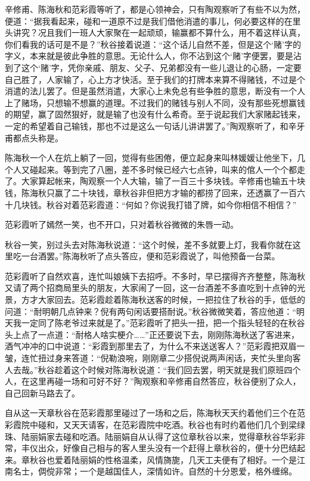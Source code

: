 \documentclass[12pt,UTF8]{ctexbook}
\begin{document}
{{{辛修甫、陈海秋和范彩霞等听了，都是心领神会，只有陶观察听了有些不以为然，便道：“据我看起来，碰和一道原不过是我们借他消遣的事儿，何必要这样的在里头讲究？况且我们一班人大家聚在一起顽顽，输赢都不算什么，用不着这样认真，你们看我的话可是不是？”秋谷接着说道：“这个话儿自然不差，但是这个‘赌’字的字义，本来就是彼此争胜的意思。无论什么人，你不沾到这个‘赌’字便罢，要是沾到了这个‘赌’字，凭你亲戚、朋友、父子、兄弟都没有一些儿退让的心肠，一定要自己胜了，人家输了，心上方才快活。至于我们的打牌本来算不得赌钱，不过是个消遣的法儿罢了。但是虽然消遣，大家心上未免总有些争胜的意思，断没有一个人上了赌场，只想输不想赢的道理。不过我们的赌钱与别人不同，没有那些死想赢钱的期望，赢了固然狠好，就是输了也没有什么希奇。至于说起我们大家赌起钱来，一定的希望着自己输钱，那也不过是这么一句话儿讲讲罢了。”陶观察听了，和辛牙甫都点头称是。

陈海秋一个人在炕上躺了一回，觉得有些困倦，便立起身来叫林媛媛让他坐下，几个人又碰起来。等到完了八圈，差不多时候已经六七点钟，叫来的倌人一个个都走了。大家算起帐来，陶观察一个人大输，输了一百三十多块钱。辛修甫也输五十块钱，陈海秋只赢了二十块钱，章秋谷非但把方才输的都捞了回来，还透赢了一百六十几块钱。秋谷对着范彩霞道：“何如？你说我打错了牌，如今你相信不相信？”

范彩霞听了嫣然一笑，也不开口，只对着秋谷微微的朱唇一动。

秋谷一笑，别过头去对陈海秋说道：“这个时候，差不多就要上灯，我看你就在这里吃一台酒罢。”陈海秋听了点头答应，便和范彩霞说了，叫他预备一台菜。

范彩霞听了自然欢喜，连忙叫娘姨下去招呼。不多时，早已摆得齐齐整整，陈海秋又请了两个招商局里头的朋友，大家闹了一回，这一台酒差不多直吃到十点钟的光景，方才大家回去。范彩霞趁着陈海秋送客的时候，一把拉住了秋谷的手，低低的问道：“耐明朝几点钟来？倪有两句闲话要搭耐说。”秋谷微微笑着，答应他道：“明天我一定同了陈老爷过来就是了。”范彩霞听了把头一扭，把一个指头轻轻的在秋谷头上点了一点道：“耐格人啥实梗介……”正还要说下去，刚刚陈海秋送了客进来，酒气冲冲的口中说道：“彩霞到那里去了，为什么不来送送客人？”范彩霞把双眉一皱，连忙扭过身来答道：“倪勒浪啘，刚刚章二少搭倪说两声闲话，夹忙头里向客人去哉。”秋谷趁着这个时候对陈海秋说道：“我们回去罢，明天就是我们原班四个人，在这里再碰一场和可好不好？”陶观察和辛修甫自然答应，秋谷便别了众人，自己回新马路去了。

自从这一天章秋谷在范彩霞那里碰过了一场和之后，陈海秋天天约着他们三个在范彩霞院中碰和，又天天请客，在范彩霞院中吃酒。秋谷也有时约着他们几个到梁绿珠、陆丽娟家去碰和吃酒。陆丽娟自从认得了这位章秋谷以来，觉得章秋谷华彩非常，丰仪出众，好像自己相与的客人里头没有一个赶得上章秋谷的，便十分巴结起来。章秋谷也爱着陆丽娟的性格温柔，风情旖旎，几天工夫便有了相好。一个是江南名士，倜傥非常；一个是越国佳人，深情如许。自然的十分恩爱，格外缠绵。

}}}
\end{document}
